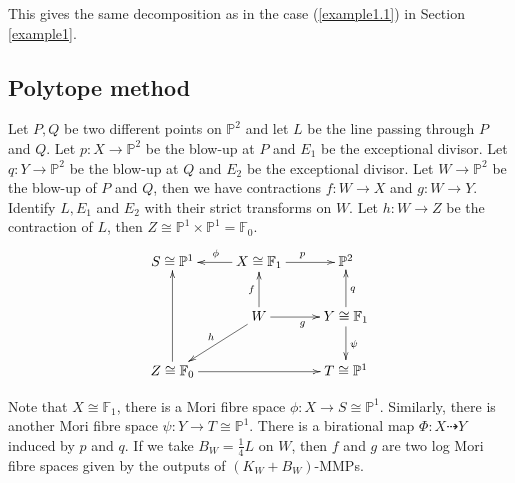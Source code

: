 This gives the same decomposition as in the case (\ref{example1.1}) in  Section \ref{example1}.

\subsection{Polytope method}
Let  $P,Q$ be two different points on $\mathbb{P}^{2}$ and let $L$ be the line passing through $P$ and $Q$. Let $p:X\to \mathbb{P}^{2}$ be the blow-up at $P$ and $E_{1}$ be the exceptional divisor. Let $q:Y\to \mathbb{P}^{2}$ be the blow-up at $Q$ and $E_{2}$ be the exceptional divisor. Let $W\to \mathbb{P}^{2}$ be the blow-up of $P$ and $Q$, then we have contractions $f:W\to X$ and $g:W\to Y$. Identify $L,E_{1}$ and $E_{2}$ with their strict transforms on  $W$. Let $h:W\to Z$ be the contraction of $L$, then $Z\cong \mathbb{P}^{1} \times \mathbb{P}^{1}=\mathbb{F}_{0}$.
\[
  \xymatrix{
    S\cong \mathbb{P}^{1}&X\cong \mathbb{F}_{1}\ar[l]_{\phi}\ar[r]^{p} & \mathbb{P}^{2} \\
    &W\ar[u]^{f}\ar[r]_{g}\ar[ld]_{h} & Y\cong \mathbb{F}_{1}\ar[u]_{q}\ar[d]^{\psi}\\
    Z\cong \mathbb{F}_{0}\ar[uu]\ar[rr]&&T\cong \mathbb{P}^{1}
  }
\]

Note that $X\cong \mathbb{F}_{1}$, there is a  Mori fibre space $\phi:X\to S \cong \mathbb{P}^{1}$. Similarly, there is another Mori fibre space $\psi: Y\to T\cong \mathbb{P}^{1}$. There is a birational map $\Phi: X\dashrightarrow  Y$ induced by $p$ and $q$. If we take $B_{W}=\frac{1}{4}L$ on $W$, then $f$ and $g$ are two log Mori fibre spaces given by the outputs of $(K_{W}+B_{W})$-MMPs.

